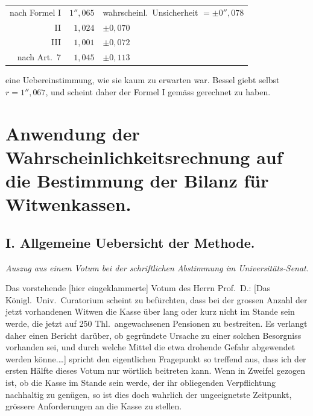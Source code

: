 \documentclass[12pt,a4paper]{article}
\begin{document}
\begin{center}
\begin{tabular}{r@{\quad\dots\quad}r@{,\quad}l}
nach Formel I & $1''{,}065$ & wahrscheinl.\ Unsicherheit $= \pm 0''{,}078$ \\
II & $1{,}024$ & $\pm 0{,}070$ \\
III & $1{,}001$ & $\pm 0{,}072$ \\
nach Art.\ 7 & $1{,}045$ & $\pm 0{,}113$
\end{tabular}
\end{center}

eine Uebereinstimmung, wie sie kaum zu erwarten war. Bessel giebt selbst $r = 1''{,}067$, und scheint daher der Formel I gem\"ass gerechnet zu haben.

\newpage

\section*{Anwendung der Wahrscheinlichkeitsrechnung auf die Bestimmung der Bilanz f\"ur Witwenkassen.}

\subsection*{I. Allgemeine Uebersicht der Methode.}

\textit{Auszug aus einem Votum bei der schriftlichen Abstimmung im Universit\"ats-Senat.}

Das vorstehende [hier eingeklammerte] Votum des Herrn Prof.\ D.: [Das K\"onigl.\ Univ.\ Curatorium scheint zu bef\"urchten, dass bei der grossen Anzahl der jetzt vorhandenen Witwen die Kasse \"uber lang oder kurz nicht im Stande sein werde, die jetzt auf 250 Thl.\ angewachsenen Pensionen zu bestreiten. Es verlangt daher einen Bericht dar\"uber, ob gegr\"undete Ursache zu einer solchen Besorgniss vorhanden sei, und durch welche Mittel die etwa drohende Gefahr abgewendet werden k\"onne.\dots] spricht den eigentlichen Fragepunkt so treffend aus, dass ich der ersten H\"alfte dieses Votum nur w\"ortlich beitreten kann. Wenn in Zweifel gezogen ist, ob die Kasse im Stande sein werde, der ihr obliegenden Verpflichtung nachhaltig zu gen\"ugen, so ist dies doch wahrlich der ungeeignetste Zeitpunkt, gr\"ossere Anforderungen an die Kasse zu stellen.
\end{document}
